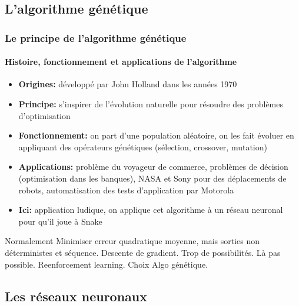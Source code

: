 \documentclass[10pt]{beamer}
\begin{document}
\begin{frame}
\end{frame}


\subsection{L'algorithme génétique}

\begin{frame}
\frametitle{Le principe de l'algorithme génétique}
\framesubtitle{Histoire, fonctionnement et applications de l'algorithme}      
\begin{itemize}
\item \textbf{Origines:} développé par John Holland dans les années 1970
\item \textbf{Principe:} s'inspirer de l'évolution naturelle pour
    résoudre des problèmes d'optimisation
\item \textbf{Fonctionnement:} on part d'une population aléatoire, on les fait évoluer en appliquant des opérateurs
    génétiques (sélection, crossover, mutation)
\item \textbf{Applications:} problème du voyageur de commerce, problèmes de décision (optimisation dans les banques), NASA et Sony pour des déplacements de robots, automatisation des tests d'application par Motorola
    
\item \textbf{Ici:} application ludique, on applique cet algorithme à un réseau neuronal pour qu'il joue à Snake
\end{itemize}  
\end{frame}
  
\begin{frame}
Normalement Minimiser erreur quadratique moyenne, mais sorties non déterministes et séquence.
Descente de gradient.
Trop de possibilités.
Là pas possible.
Reenforcement learning.
Choix Algo génétique.
\end{frame}

\begin{frame}
\end{frame}

\subsection{Les réseaux neuronaux}
\end{document}
